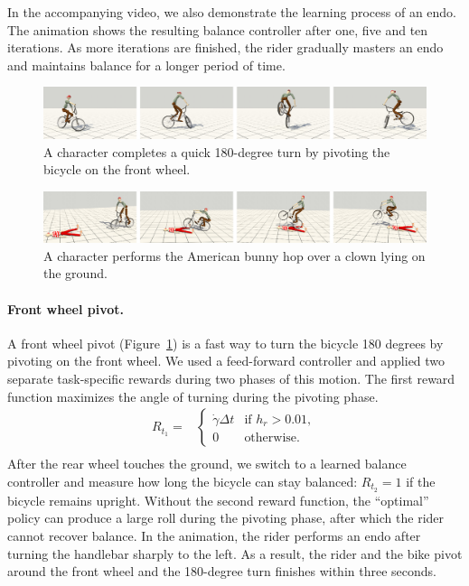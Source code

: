 In the accompanying video, we also demonstrate the learning process of an endo. The animation shows the resulting balance controller after one, five and ten iterations. As more iterations are finished, the rider gradually masters an endo and maintains balance for a longer period of time.

\begin{figure}[t]
\centering
\includegraphics[width=\textwidth]{figures/frontWheelPivot}
\caption{A character completes a quick 180-degree turn by pivoting the bicycle on the front wheel.}
\label{fig:pivot}
\end{figure}


\begin{figure}[t]
\centering
\includegraphics[width=\textwidth]{figures/bunnyHop}
\caption{A character performs the American bunny hop over a clown lying on the ground.}
\label{fig:bunnyhop}
\end{figure}

\paragraph{Front wheel pivot.} A front wheel pivot (Figure~\ref{fig:pivot}) is a fast way to turn the bicycle 180 degrees by pivoting on the front wheel. We used a feed-forward controller and applied two separate task-specific rewards during two phases of this motion. The first reward function maximizes the angle of turning during the pivoting phase.
\begin {displaymath}
\begin{array}{ll}
R_{t_1} = & \left\{ \begin{array}{ll}
\dot{\gamma} \Delta t & \textrm{if }h_r > 0.01,\\
0 & \textrm{otherwise.}
\end{array} \right. \\
\end{array}
\end {displaymath}
After the rear wheel touches the ground, we switch to a learned balance controller and measure how long the bicycle can stay balanced: $R_{t_2}=1$ if the bicycle remains upright. Without the second reward function, the ``optimal'' policy can produce a large roll during the pivoting phase, after which the rider cannot recover balance. In the animation, the rider performs an endo after turning the handlebar sharply to the left. As a result, the rider and the bike pivot around the front wheel and the 180-degree turn finishes within three seconds.

